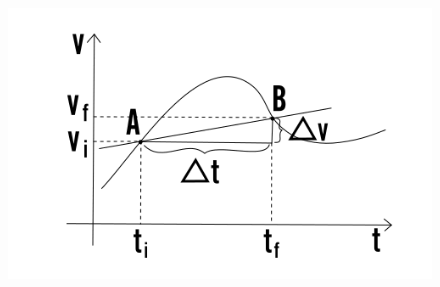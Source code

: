 \documentclass[11pt]{article}
\begin{document}
\begin{figure}[H]
\label{grafico1accIst}
\includegraphics[scale=0.7]{accIst_1.png}
\centering
\end{figure}
\end{document}
